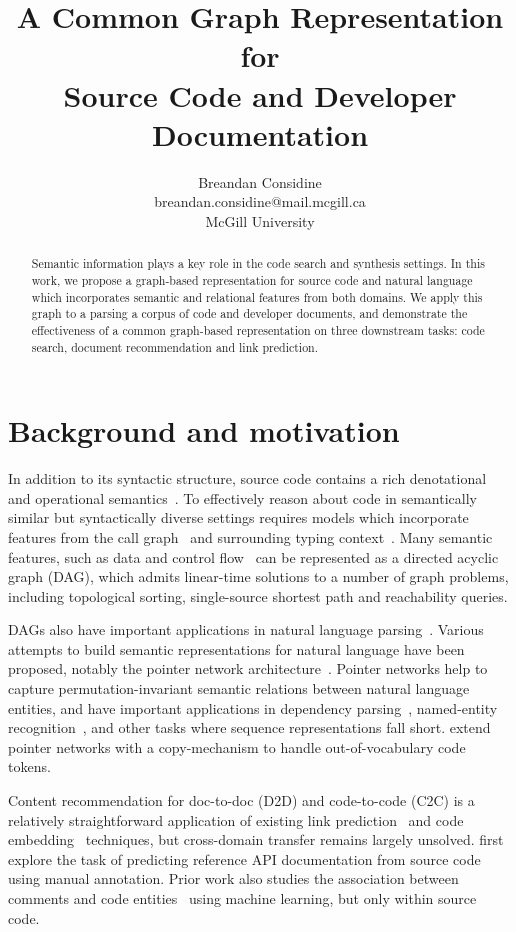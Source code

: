 \documentclass{article}
\title{A Common Graph Representation for\\Source Code and Developer Documentation}
\author{Breandan Considine\\
breandan.considine@mail.mcgill.ca\\
McGill University}
\begin{document}
\maketitle

\begin{abstract}
Semantic information plays a key role in the code search and synthesis settings. In this work, we propose a graph-based representation for source code and natural language which incorporates semantic and relational features from both domains. We apply this graph to a parsing a corpus of code and developer documents, and demonstrate the effectiveness of a common graph-based representation on three downstream tasks: code search, document recommendation and link prediction.
\end{abstract}

\section{Background and motivation}

In addition to its syntactic structure, source code contains a rich denotational and operational semantics~\citep{henkel2018code}. To effectively reason about code in semantically similar but syntactically diverse settings requires models which incorporate features from the call graph~\citep{gu2016deep, 10.1145/3361242.3362774} and surrounding typing context~\citep{allamanis2017learning}. Many semantic features, such as data and control flow~\citep{si2018learning} can be represented as a directed acyclic graph (DAG), which admits linear-time solutions to a number of graph problems, including topological sorting, single-source shortest path and reachability queries.

DAGs also have important applications in natural language parsing~\citep{sagae2008shift, quernheim2012dagger}. Various attempts to build semantic representations for natural language have been proposed, notably the pointer network architecture~\citep{vinyals2015pointer, vinyals2015order}. Pointer networks help to capture permutation-invariant semantic relations between natural language entities, and have important applications in dependency parsing~\citep{ma2018stack}, named-entity recognition~\citep{lample2016neural}, and other tasks where sequence representations fall short. \citet{li2017code} extend pointer networks with a copy-mechanism to handle out-of-vocabulary code tokens.

Content recommendation for doc-to-doc (D2D) and code-to-code (C2C) is a relatively straightforward application of existing link prediction~\citep{zhang2018link} and code embedding~\citep{gu2018deep} techniques, but cross-domain transfer remains largely unsolved. \citet{robillard2015recommending} first explore the task of predicting reference API documentation from source code using manual annotation. Prior work also studies the association between comments and code entities~\citep{panthaplackel2020associating} using machine learning, but only within source code.
\end{document}
